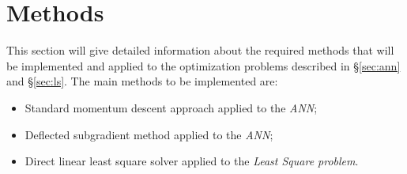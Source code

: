 \section{Methods}
This section will give detailed information about the required methods that will be implemented and applied to the optimization problems described in \S\ref{sec:ann} and \S\ref{sec:ls}. The main methods to be implemented are:
\begin{itemize}
    \item Standard momentum descent approach applied to the \textit{ANN};
    \item Deflected subgradient method applied to the \textit{ANN};
    \item Direct linear least square solver applied to the \textit{Least Square problem}.
\end{itemize}


